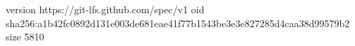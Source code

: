 version https://git-lfs.github.com/spec/v1
oid sha256:a1b42fc0892d131e003de681eae41f77b1543be3e3e827285d4caa38d99579b2
size 5810
